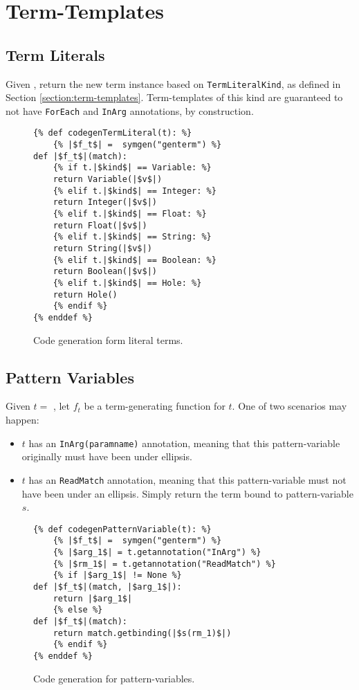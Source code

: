\section{Term-Templates}

\subsection{Term Literals}

Given \TermLiteral, return the new term instance based on \texttt{TermLiteralKind}, as defined in Section \ref{section:term-templates}. Term-templates of this kind are guaranteed to not have \texttt{ForEach} and \texttt{InArg} annotations, by construction.

\begin{figure}[ht]
\begin{verbatim}
{% def codegenTermLiteral(t): %}
	{% |$f_t$| =  symgen("genterm") %}
def |$f_t$|(match):
	{% if t.|$kind$| == Variable: %}
	return Variable(|$v$|)
	{% elif t.|$kind$| == Integer: %}
	return Integer(|$v$|)
	{% elif t.|$kind$| == Float: %}
	return Float(|$v$|)
	{% elif t.|$kind$| == String: %}
	return String(|$v$|)
	{% elif t.|$kind$| == Boolean: %}
	return Boolean(|$v$|)
	{% elif t.|$kind$| == Hole: %}
	return Hole()
	{% endif %}
{% enddef %}
\end{verbatim}
\caption{Code generation form literal terms.}
\label{codegen-term-template-lit}
\end{figure}


\subsection{Pattern Variables}

Given $t =$ \PatternVariable, let $f_t$ be a term-generating function for $t$. One of two scenarios may happen:
\begin{itemize}
\item $t$ has an \texttt{InArg(paramname)} annotation, meaning that this pattern-variable originally must have been under ellipsis.
\item $t$ has an \texttt{ReadMatch} annotation, meaning that this pattern-variable must not have been under an ellipsis. Simply return the term bound to pattern-variable $s$.
\end{itemize}

\begin{figure}[htb]
\begin{verbatim}
{% def codegenPatternVariable(t): %}
	{% |$f_t$| =  symgen("genterm") %}
	{% |$arg_1$| = t.getannotation("InArg") %}
	{% |$rm_1$| = t.getannotation("ReadMatch") %}
	{% if |$arg_1$| != None %}
def |$f_t$|(match, |$arg_1$|):
	return |$arg_1$|
	{% else %}
def |$f_t$|(match):
	return match.getbinding(|$s(rm_1)$|)
	{% endif %}
{% enddef %}
\end{verbatim}
\caption{Code generation for pattern-variables.}
\label{codegen-term-pv}
\end{figure}

